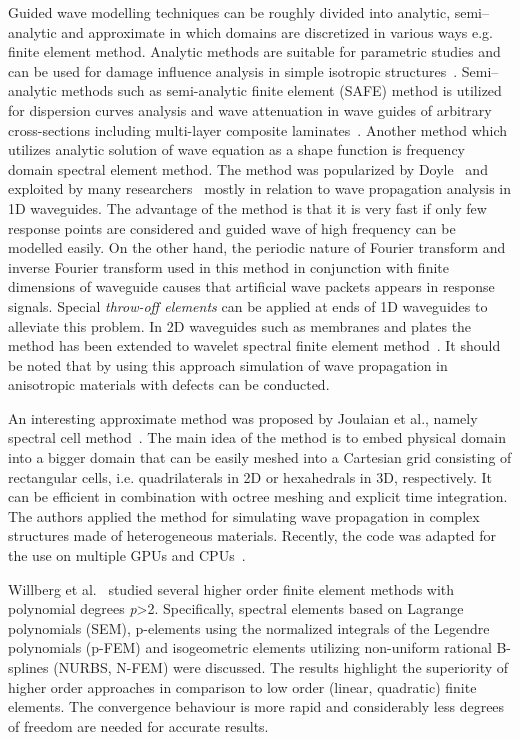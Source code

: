 \documentclass[preprint,12pt]{elsarticle}
\begin{document}
	Guided wave modelling techniques can be roughly divided into analytic, semi--analytic and approximate in which domains are discretized in various ways e.g. finite element method. Analytic methods are suitable for parametric studies and can be used for damage influence analysis in simple isotropic structures~\cite{Giurgiutiu2014}. Semi--analytic methods such as semi-analytic finite element (SAFE) method is utilized for dispersion curves analysis and wave attenuation in wave guides of arbitrary cross-sections including multi-layer composite laminates~\cite{Bartoli2006}. Another method which utilizes analytic solution of wave equation as a shape function is frequency domain spectral element method. The method was popularized by Doyle~\cite{Doyle1989} and exploited by many researchers~\cite{RoyMahapatra2003,Palacz2005} mostly in relation to wave propagation analysis in 1D waveguides. The advantage of the method is that it is very fast if only few response points are considered and guided wave of high frequency can be modelled easily. On the other hand, the periodic nature of Fourier transform and inverse Fourier transform used in this method in conjunction with finite dimensions of waveguide causes that artificial wave packets appears in response signals. Special \emph{throw-off elements} can be applied at ends of 1D waveguides to alleviate this problem. In 2D waveguides such as membranes and plates the method has been extended to wavelet spectral finite element method~\cite{Mitra2008,Yang2016}. It should be noted that by using this approach simulation of wave propagation in anisotropic materials with defects can be conducted.
	
	An interesting approximate method was proposed by Joulaian et al., namely spectral cell method~\cite{Joulaian2014}. The main idea of the method is to embed physical domain into a bigger domain 
	that can be easily meshed into a Cartesian grid consisting of rectangular cells, i.e. quadrilaterals
	in 2D or hexahedrals in 3D, respectively. It can be efficient in combination with octree meshing and explicit time integration. The authors applied the method for simulating wave propagation in complex structures made of heterogeneous materials. Recently, the code was adapted for the use on multiple GPUs and CPUs~\cite{Mossaiby2019}. 
	
	Willberg et al.~\cite{Willberg2012} studied several higher order finite element methods with polynomial degrees \emph{p}{\textgreater}2. Specifically, spectral elements based on Lagrange polynomials (SEM), p-elements using the normalized integrals of the Legendre polynomials (p-FEM) and isogeometric elements utilizing non-uniform rational B-splines (NURBS, N-FEM) were discussed. The results highlight the superiority of higher order approaches in comparison to low order (linear, quadratic) finite elements. The convergence behaviour is more rapid and considerably less degrees of freedom are needed for accurate results.
	
\end{document}
